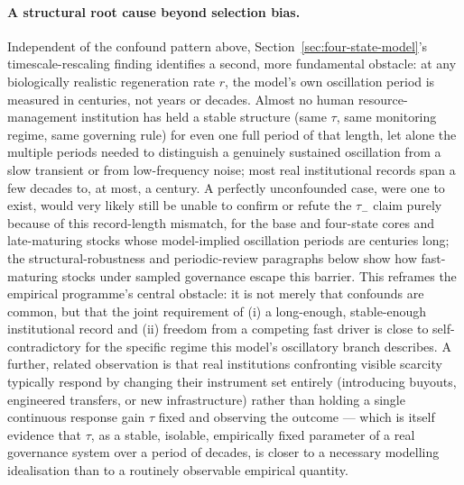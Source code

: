 \documentclass[twocolumn,10pt]{article}
\begin{document}
\paragraph{A structural root cause beyond selection bias.} Independent of the confound pattern above, Section~\ref{sec:four-state-model}'s timescale-rescaling finding identifies a second, more fundamental obstacle: at any biologically realistic regeneration rate $r$, the model's own oscillation period is measured in centuries, not years or decades. Almost no human resource-management institution has held a stable structure (same $\tau$, same monitoring regime, same governing rule) for even one full period of that length, let alone the multiple periods needed to distinguish a genuinely sustained oscillation from a slow transient or from low-frequency noise; most real institutional records span a few decades to, at most, a century. A perfectly unconfounded case, were one to exist, would very likely still be unable to confirm or refute the $\tau_-$ claim purely because of this record-length mismatch, for the base and four-state cores and late-maturing stocks whose model-implied oscillation periods are centuries long; the structural-robustness and periodic-review paragraphs below show how fast-maturing stocks under sampled governance escape this barrier. This reframes the empirical programme's central obstacle: it is not merely that confounds are common, but that the joint requirement of (i) a long-enough, stable-enough institutional record and (ii) freedom from a competing fast driver is close to self-contradictory for the specific regime this model's oscillatory branch describes. A further, related observation is that real institutions confronting visible scarcity typically respond by changing their instrument set entirely (introducing buyouts, engineered transfers, or new infrastructure) rather than holding a single continuous response gain $\tau$ fixed and observing the outcome --- which is itself evidence that $\tau$, as a stable, isolable, empirically fixed parameter of a real governance system over a period of decades, is closer to a necessary modelling idealisation than to a routinely observable empirical quantity.
\end{document}
